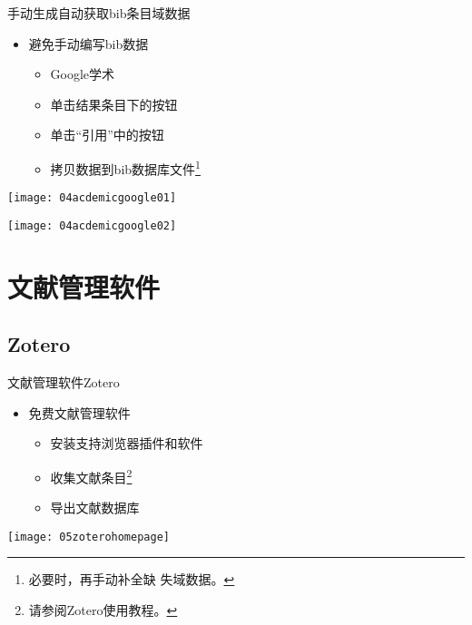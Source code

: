 \documentclass[fontset = none, t]{ctexbeamer}
\begin{document}
\begin{frame}[fragile]{手动生成}{自动获取bib条目域数据}
  \begin{spacing}{1.5}
    \begin{itemize}
    \item 避免手动编写bib数据
      \begin{itemize}
      \item Google学术
      \item 单击结果条目下的\alert{}按钮
      \item 单击\enquote{引用}中的\alert{}按钮
      \item 拷贝数据到bib数据库文件\footnote[frame,2]{必要时，再手动补全缺
          失域数据。}
      \end{itemize}
    \end{itemize}    
    \begin{center}
      \begin{annotatedFigure}
        {\texttt{[image: 04acdemicgoogle01]}}
      \end{annotatedFigure}\quad
      \begin{annotatedFigure}
        {\texttt{[image: 04acdemicgoogle02]}}
      \end{annotatedFigure}
    \end{center}
  \end{spacing}
\end{frame}

\section[文献管理软件]{文献管理软件}
\subsection[Zotero]{Zotero}
\begin{frame}[fragile]{文献管理软件}{Zotero}
  \begin{spacing}{1.5}
    \begin{itemize}
    \item 免费文献管理软件
      \begin{itemize}
      \item 安装支持浏览器插件和软件
      \item 收集文献条目\footnote[frame,2]{请参阅Zotero使用教程。}
      \item 导出文献数据库
      \end{itemize}
    \end{itemize}    
    \begin{center}
      \texttt{[image: 05zoterohomepage]}
    \end{center}
  \end{spacing}
\end{frame}
\end{document}
